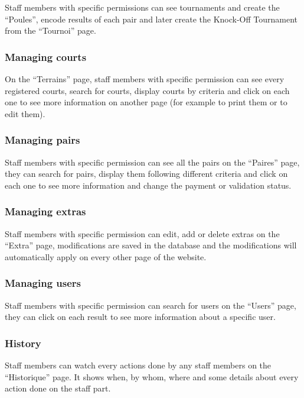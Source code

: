Staff members with specific permissions can see tournaments and create the \enquote{Poules}, encode results of each pair and later create the Knock-Off Tournament from the \enquote{Tournoi} page.

\subsubsection{Managing courts}

On the \enquote{Terrains} page, staff members with specific permission can see every registered courts, search for courts, display courts by criteria and click on each one to see more information on another page (for example to print them or to edit them).

\subsubsection{Managing pairs}

Staff members with specific permission can see all the pairs on the \enquote{Paires} page, they can search for pairs, display them following different criteria and click on each one to see more information and change the payment or validation status.

\subsubsection{Managing extras}

Staff members with specific permission can edit, add or delete extras on the \enquote{Extra} page, modifications are saved in the database and the modifications will automatically apply on every other page of the website.

\subsubsection{Managing users}

Staff members with specific permission can search for users on the \enquote{Users} page, they can click on each result to see more information about a specific user.

\subsubsection{History}

Staff members can watch every actions done by any staff members on the \enquote{Historique} page. It shows when, by whom, where and some details about every action done on the staff part.

